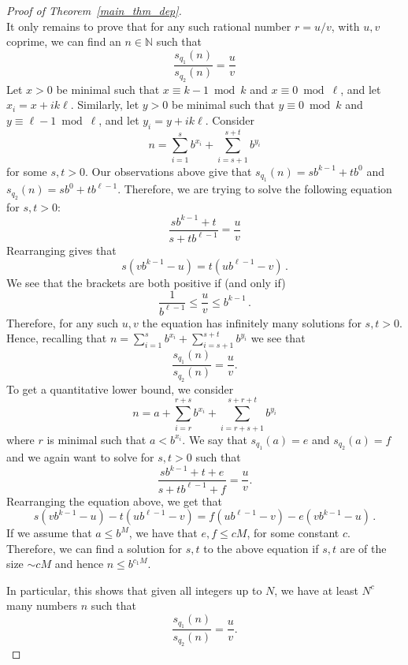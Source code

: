 \documentclass[10pt,a4paper]{amsart}
\newcommand\NN{\mathbb{N}}
\renewcommand{\leq}{\leqslant}
\begin{document}
\begin{proof}[Proof of Theorem~\ref{main_thm_dep}]
\[	\]
	It only remains to prove that for any such rational number $r=u/v$, with $u,v$ coprime, we can find an $n\in \NN$ such that
	\[
	\frac{s_{q_1}(n)}{s_{q_2}(n)}=\frac uv
	\]
	Let $x>0$ be minimal such that $x\equiv k-1 \bmod k$ and $x\equiv 0 \bmod \ell$, and let $x_i=x+ik\ell$. Similarly, let $y>0$ be minimal such that $y\equiv 0 \bmod k$ and $y\equiv \ell-1 \bmod \ell$, and let $y_i=y+ik\ell$. Consider
	\[
	n=\sum_{i=1}^{s}b^{x_i}+\sum_{i=s+1}^{s+t}b^{y_i}
	\]
	for some $s,t>0$. Our observations above give that $s_{q_1}(n)= sb^{k-1}+tb^{0}$ and $s_{q_2}(n)= sb^{0}+tb^{\ell-1}$. Therefore, we are trying to solve the following equation for $s,t>0$:
	\[
	\frac{sb^{k-1}+t}{s+tb^{\ell-1}}=\frac uv
	\]
	Rearranging gives that
	\[
	s(vb^{k-1}-u)=t(ub^{\ell-1}-v)\,.
	\]
	We see that the brackets are both positive if (and only if)
	\[ 
	\frac{1}{b^{\ell-1}}\leq \frac uv \leq b^{k-1}\,.
	\]
	Therefore, for any such $u,v$ the equation has infinitely many solutions for $s,t>0$. Hence, recalling that $n=\sum_{i=1}^{s}b^{x_i}+\sum_{i=s+1}^{s+t}b^{y_i}$ we see that
	\[
	\frac{s_{q_1}(n)}{s_{q_2}(n)}=\frac uv.
	\]
	To get a quantitative lower bound, we consider 
	\[
	n=a+\sum_{i=r}^{r+s}b^{x_i}+\sum_{i=r+s+1}^{s+r+t}b^{y_i}
	\]
	where $r$ is minimal such that $a<b^{x_i}$. We say that $s_{q_1}(a)=e$ and $s_{q_2}(a)=f$ and we again want to solve for $s,t>0$ such that
	\[
	\frac{sb^{k-1}+t+e}{s+tb^{\ell-1}+f}=\frac uv.
	\]
	Rearranging the equation above, we get that
	\[
	s(vb^{k-1}-u)-t(ub^{\ell-1}-v)=f(ub^{\ell-1}-v)-e(vb^{k-1}-u)\,.
	\]
	If we assume that $a\leq b^M$, we have that $e,f\leq cM$, for some constant $c$. Therefore, we can find a solution for $s,t$ to the above equation if $s,t$ are of the size $\sim cM$ and hence $n\leq b^{c_1M}$. 
	
	In particular, this shows that given all integers up to $N$, we have at least $N^c$ many numbers $n$ such that
	\[\frac{s_{q_1}(n)}{s_{q_2}(n)}=\frac uv.\]
\end{proof}
\end{document}
